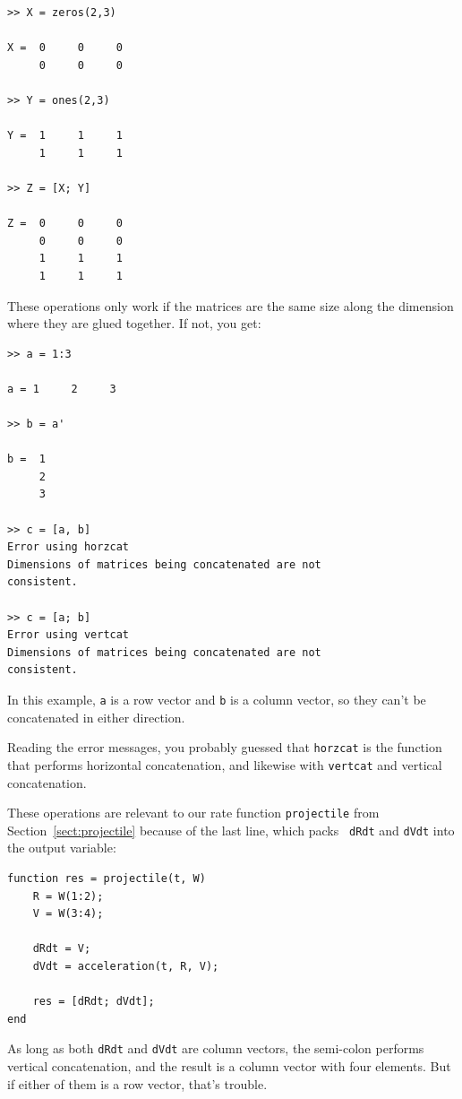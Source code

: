 \documentclass[
]{book}
\begin{document}
\begin{verbatim}
>> X = zeros(2,3)

X =  0     0     0
     0     0     0

>> Y = ones(2,3)

Y =  1     1     1
     1     1     1

>> Z = [X; Y]

Z =  0     0     0
     0     0     0
     1     1     1
     1     1     1
\end{verbatim}

These operations only work if the matrices are the same size along
the dimension where they are glued together.  If not, you get:

\begin{verbatim}
>> a = 1:3

a = 1     2     3

>> b = a'

b =  1
     2
     3

>> c = [a, b]
Error using horzcat
Dimensions of matrices being concatenated are not
consistent.

>> c = [a; b]
Error using vertcat
Dimensions of matrices being concatenated are not
consistent.
\end{verbatim}

In this example, {\tt a} is a row vector and {\tt b} is a column
vector, so they can't be concatenated in either direction.

Reading the error messages, you probably guessed that {\tt horzcat}
is the function that performs horizontal concatenation, and likewise
with {\tt vertcat} and vertical concatenation.

These operations are relevant to our rate function {\tt projectile} from
Section~\ref{sect:projectile} because of the last line, which packs {\tt
dRdt} and {\tt dVdt} into the output variable:

\begin{verbatim}
function res = projectile(t, W)
    R = W(1:2);
    V = W(3:4);

    dRdt = V;
    dVdt = acceleration(t, R, V);

    res = [dRdt; dVdt];
end
\end{verbatim}

As long as both {\tt dRdt} and {\tt dVdt} are column vectors,
the semi-colon performs vertical concatenation, and the result is
a column vector with four elements.  But if either of them is a
row vector, that's trouble.
\end{document}
